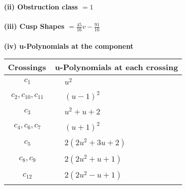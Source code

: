 \documentclass[1p]{elsarticle_modified}
\theoremstyle{definition}
\begin{document}
\flushleft \textbf{(ii) Obstruction class $= 1$}\\~\\
\flushleft \textbf{(iii) Cusp Shapes $= \frac{45}{16} v-\frac{91}{16}$}\\~\\
\newpage\renewcommand{\arraystretch}{1}
\flushleft \textbf{(iv) u-Polynomials at the component}\newline \\
\begin{tabular}{m{50pt}|m{274pt}}
Crossings & \hspace{64pt}u-Polynomials at each crossing \\
\hline $$\begin{aligned}c_{1}\end{aligned}$$&$\begin{aligned}
&u^2
\end{aligned}$\\
\hline $$\begin{aligned}c_{2},c_{10},c_{11}\end{aligned}$$&$\begin{aligned}
&(u-1)^2
\end{aligned}$\\
\hline $$\begin{aligned}c_{3}\end{aligned}$$&$\begin{aligned}
&u^2+u+2
\end{aligned}$\\
\hline $$\begin{aligned}c_{4},c_{6},c_{7}\end{aligned}$$&$\begin{aligned}
&(u+1)^2
\end{aligned}$\\
\hline $$\begin{aligned}c_{5}\end{aligned}$$&$\begin{aligned}
&2(2 u^2+3 u+2)
\end{aligned}$\\
\hline $$\begin{aligned}c_{8},c_{9}\end{aligned}$$&$\begin{aligned}
&2(2 u^2+u+1)
\end{aligned}$\\
\hline $$\begin{aligned}c_{12}\end{aligned}$$&$\begin{aligned}
&2(2 u^2- u+1)
\end{aligned}$\\
\hline
\end{tabular}\\~\\
\end{document}
